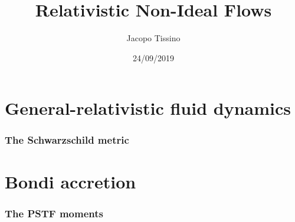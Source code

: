 \documentclass{beamer}
\title{Relativistic Non-Ideal Flows}
\author{Jacopo Tissino}
\date{24/09/2019}
\begin{document}
\frame{\titlepage}

\section{General-relativistic fluid dynamics}

\begin{frame}
    \frametitle{The Schwarzschild metric}
\end{frame}

\section{Bondi accretion}

\begin{frame}
    \frametitle{The PSTF moments}
\end{frame}
\end{document}
